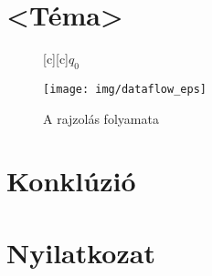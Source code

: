 \documentclass[12pt]{report}
\theoremstyle{definition}
\begin{document}

    \chapter{<Téma>\cite{Cabanier:14:HCC}}

    \begin{figure}[h]
    \centering
    [c][c]{$q_0$}
    \centerline{\texttt{[image: img/dataflow\_eps]}}
    \caption{\label{dataflow-diagram} A rajzolás folyamata}
    \end{figure}



    \chapter{Konklúzió}



    {}
    


    \chapter*{Nyilatkozat}

\end{document}
